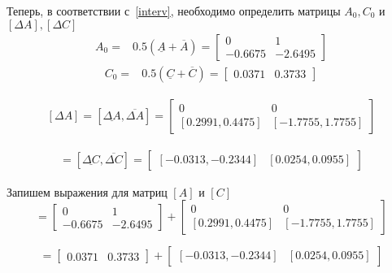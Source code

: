 Теперь, в соответствии с~\ref{interv}, необходимо определить матрицы $A_0, C_0$ и $[\Delta A], [\Delta C]$
\begin{align}\label{midA}
	A_0 =& 0.5 (\underline{A} + \overline{A}) =
	\begin{bmatrix}
		0&1\\
		-0.6675& -2.6495
	\end{bmatrix}
\end{align}
\begin{align}
	C_0 =& 0.5 (\underline{C} + \overline{C}) = 
	\begin{bmatrix}
		0.0371 & 0.3733
	\end{bmatrix}
\end{align}

\begin{align}\label{widA}
	[\Delta A] = [\underline{\Delta A}, \overline{\Delta A}] = 
	\begin{bmatrix}
		0&0\\
		[0.2991, 0.4475] & [-1.7755, 1.7755]
	\end{bmatrix}
\end{align}

\begin{align}
	[\Delta C] = [\underline{\Delta C}, \overline{\Delta C}] = 
	\begin{bmatrix}
		[-0.0313, -0.2344] & [0.0254, 0.0955]
	\end{bmatrix}
\end{align}

Запишем выражения для матриц $[A]$ и $[C]$
\begin{equation}
	[A] =
	\begin{bmatrix}
		0&1\\
		-0.6675& -2.6495
	\end{bmatrix} 
	+
	\begin{bmatrix}
		0&0\\
		[0.2991, 0.4475] & [-1.7755, 1.7755]
	\end{bmatrix}	
\end{equation}

\begin{equation}
	[C] =
	\begin{bmatrix}
		0.0371 & 0.3733
	\end{bmatrix}
	+
	\begin{bmatrix}
		[-0.0313, -0.2344] & [0.0254, 0.0955]
	\end{bmatrix}	
\end{equation}





\newpage